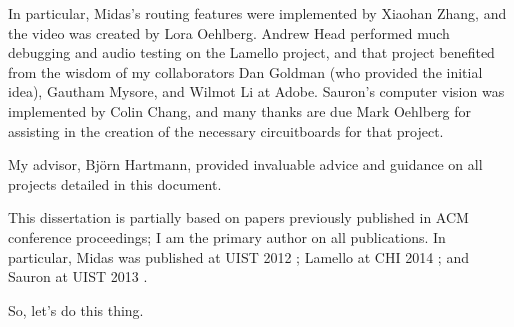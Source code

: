 In particular, Midas's routing features were implemented by Xiaohan Zhang, and the video was created by Lora Oehlberg. Andrew Head performed much debugging and audio testing on the Lamello project, and that project benefited from the wisdom of my collaborators Dan Goldman (who provided the initial idea), Gautham Mysore, and Wilmot Li at Adobe. Sauron's computer vision was implemented by Colin Chang, and many thanks are due Mark Oehlberg for assisting in the creation of the necessary circuitboards for that project.

My advisor, Bj\"orn Hartmann, provided invaluable advice and guidance on all projects detailed in this document.

This dissertation is partially based on papers previously published in ACM conference proceedings; I am the primary author on all publications. In particular, Midas was published at UIST 2012 \cite{savage-midas}; Lamello at CHI 2014 \cite{savage-lamello}; and Sauron at UIST 2013 \cite{savage-sauron}.

So, let's do this thing.
